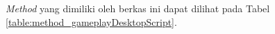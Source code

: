 \begin{enumerate}
\begin{enumerate}
\begin{enumerate}
			
			\textit{Method} yang dimiliki oleh berkas ini dapat dilihat pada Tabel \ref{table:method_gameplayDesktopScript}.
			

\end{enumerate}
\end{enumerate}
\end{enumerate}
